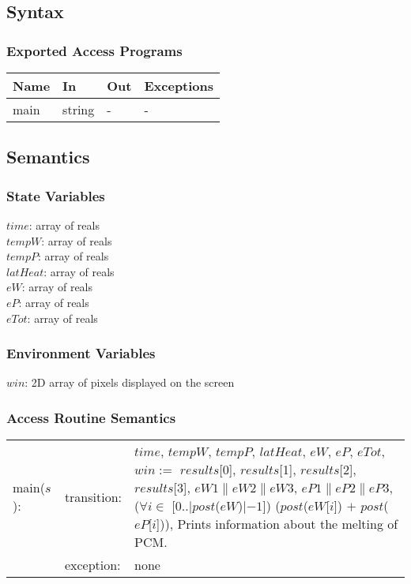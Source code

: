 \documentclass[12pt]{article}
\begin{document}
\subsection{Syntax}
\subsubsection{Exported Access Programs}
\begin{center}
\begin{tabular}{p{2cm} p{4cm} p{4cm} p{2cm}}
\hline
\textbf{Name} & \textbf{In} & \textbf{Out} & \textbf{Exceptions} \\
\hline
main & string & - & - \\
\hline
\end{tabular}
\end{center}
\subsection{Semantics}
\subsubsection{State Variables}
$time$: array of reals \\
$tempW$: array of reals \\
$tempP$: array of reals \\
$latHeat$: array of reals \\
$eW$: array of reals \\
$eP$: array of reals \\ 
$eTot$: array of reals
\subsubsection{Environment Variables}
$win$: 2D array of pixels displayed on the screen
\subsubsection{Access Routine Semantics}
\begin{tabular}{l l p{12cm}}
main($s$): & transition: & $time$, $tempW$, $tempP$, $latHeat$, $eW$, $eP$, $eTot$, $win :=$ $results$[0], $results$[1], $results$[2], $results$[3], $eW1 \| eW2 \| eW3$, $eP1 \| eP2 \| eP3$, ($\forall i \in$ [0..$|post$($eW$)$| - 1$]) ($post$($eW$[$i$]) $+$ $post$($eP$[$i$])), Prints information about the melting of PCM. \\
& exception: & none \\
\end{tabular}
\end{document}
